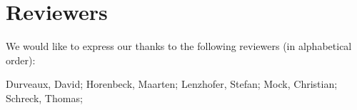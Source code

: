 \section{Reviewers}

We would like to express our thanks to the following reviewers (in alphabetical order):

Durveaux, David;
Horenbeck, Maarten;
Lenzhofer, Stefan;
Mock, Christian; 
Schreck, Thomas; 

